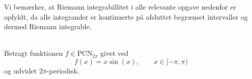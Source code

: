 \setcounter{section}{4}
\ifanswers
Vi bemærker, at Riemann integrabillitet i alle relevante opgave nedenfor er opfyldt, da alle integrander er kontinuerte på afsluttet begrænset intervaller og dermed Riemann integrable.
\fi
\begin{opg}\hfill \\
	Betragt funktionen $ f\in \text{PCN}_{2\pi} $ givet ved 
	\[ f(x)=x\sin(x), \qquad x\in[-\pi,\pi)
	\]
	og udvidet $2\pi$-periodisk.
	\begin{enumerate}

\end{enumerate}
\end{opg}
